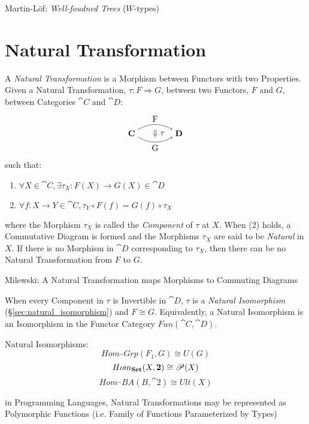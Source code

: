 Martin-L\"of: \emph{Well-foudned Trees} ($W$-types) %



\section{Natural Transformation}\label{sec:natural_transformation}

A \emph{Natural Transformation} is a Morphism between Functors with
two Properties. Given a Natural Transformation, $\tau : F \Rightarrow
G$, between two Functors, $F$ and $G$, between Categories $\cat{C}$
and $\cat{D}$:
\[
  \begin{tikzpicture}
    \node (C) at (-1,0) {$\cat{C}$};
    \node (D) at (1,0) {$\cat{D}$};
    \node (T) at (0,0) {$\;\;\;\Downarrow\tau$};
    \draw[->,bend left] (C) to node [above] {F} (D);
    \draw[->,bend right] (C) to node [below] {G} (D);
  \end{tikzpicture}
\]
such that:
\begin{enumerate}
  \item $\forall X \in \cat{C},
    \exists \tau_X : F(X) \rightarrow G(X) \in \cat{D}$
  \item $\forall f : X \rightarrow Y \in \cat{C},
    \tau_Y \circ F(f) = G(f) \circ \tau_X$
\end{enumerate}
where the Morphism $\tau_X$ is called the \emph{Component} of $\tau$
at $X$. When (2) holds, a Commutative Diagram is formed and the
Morphisms $\tau_X$ are said to be \emph{Natural} in $X$. If there is
no Morphism in $\cat{D}$ corresponding to $\tau_X$, then there can
be no Natural Transformation from $F$ to $G$.

Milewski: A Natural Transformation maps Morphisms to Commuting
Diagrams

When every Component in $\tau$ is Invertible in $\cat{D}$, $\tau$ is a
\emph{Natural Isomorphism} (\S\ref{sec:natural_isomorphism}) and $F
\cong G$. Equivalently, a Natural Isomorphism is an Isomorphism in the
Functor Category $Fun(\cat{C},\cat{D})$.

Natural Isomorphisms:
\[
  Hom_\cat{Grp}(F_1,G) \cong U(G)
\]\[
  Hom_\mathbf{Set}(X,\mathbf{2}) \cong \mathscr{P}(X)
\]\[
  Hom_\cat{BA}(B,\cat{2}) \cong Ult(X)
\]

in Programming Languages, Natural Transformations may be represented
as Polymorphic Functions (i.e. Family of Functions Parameterized by
Types)

